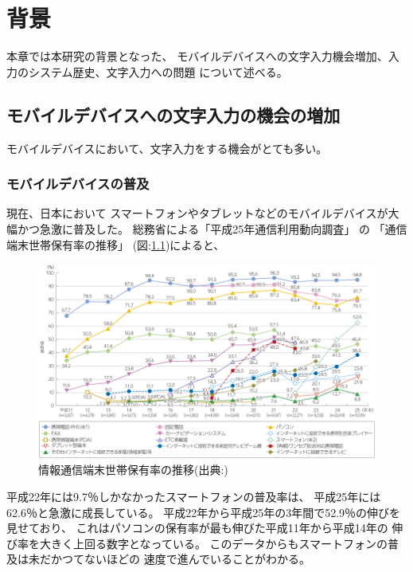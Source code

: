 \chapter{背景}
\label{chap:background}
本章では本研究の背景となった、
モバイルデバイスへの文字入力機会増加、入力のシステム歴史、文字入力への問題
について述べる。

\newpage
\section{モバイルデバイスへの文字入力の機会の増加}
モバイルデバイスにおいて、文字入力をする機会がとても多い。

\subsection{モバイルデバイスの普及}
現在、日本において
スマートフォンやタブレットなどのモバイルデバイスが大幅かつ急激に普及した。
総務省による「平成25年通信利用動向調査」
\cite{communicationreport}の
「通信端末世帯保有率の推移」
(図:\ref{fig:mobiledevicespread})によると、
\begin{figure}[htbp]
  \begin{center}
    \includegraphics[width=160mm,bb=0 0 856 494]{images/mobiledevicespread.png}
    \caption{情報通信端末世帯保有率の推移(出典:\cite{communicationreport})}
    \label{fig:mobiledevicespread}
  \end{center}
\end{figure}
平成22年には9.7％しかなかったスマートフォンの普及率は、
平成25年には62.6％と急激に成長している。
平成22年から平成25年の3年間で52.9％の伸びを見せており、
これはパソコンの保有率が最も伸びた平成11年から平成14年の
伸び率を大きく上回る数字となっている。
このデータからもスマートフォンの普及は未だかつてないほどの
速度で進んでいることがわかる。

